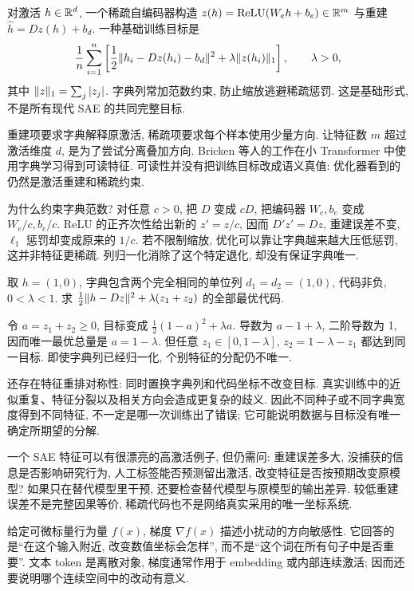 \begin{definition}
对激活 $h\in\mathbb R^d$, 一个稀疏自编码器构造 $z(h)=\operatorname{ReLU}(W_eh+b_e)\in\mathbb R^m$ 与重建 $\hat h=Dz(h)+b_d$. 一种基础训练目标是
\[
\frac1n\sum_{i=1}^n\left[\frac12\lVert h_i-Dz(h_i)-b_d\rVert^2+\lambda\lVert z(h_i)\rVert_1\right],\qquad \lambda>0,
\]
其中 $\lVert z\rVert_1=\sum_j|z_j|$. 字典列常加范数约束, 防止缩放逃避稀疏惩罚. 这是基础形式, 不是所有现代 SAE 的共同完整目标.
\end{definition}
重建项要求字典解释原激活, 稀疏项要求每个样本使用少量方向. 让特征数 $m$ 超过激活维度 $d$, 是为了尝试分离叠加方向. Bricken 等人的工作在小 Transformer 中使用字典学习得到可读特征\cite{sae}. 可读性并没有把训练目标改成语义真值: 优化器看到的仍然是激活重建和稀疏约束.

为什么约束字典范数? 对任意 $c>0$, 把 $D$ 变成 $cD$, 把编码器 $W_e,b_e$ 变成 $W_e/c,b_e/c$. ReLU 的正齐次性给出新的 $z'=z/c$, 因而 $D'z'=Dz$, 重建误差不变, $\ell_1$ 惩罚却变成原来的 $1/c$. 若不限制缩放, 优化可以靠让字典越来越大压低惩罚, 这并非特征更稀疏. 列归一化消除了这个特定退化, 却没有保证字典唯一.

\begin{example}
取 $h=(1,0)$, 字典包含两个完全相同的单位列 $d_1=d_2=(1,0)$, 代码非负, $0<\lambda<1$. 求 $\frac12\lVert h-Dz\rVert^2+\lambda(z_1+z_2)$ 的全部最优代码.
\end{example}
\begin{solution}
令 $a=z_1+z_2\ge0$, 目标变成 $\frac12(1-a)^2+\lambda a$. 导数为 $a-1+\lambda$, 二阶导数为 1, 因而唯一最优总量是 $a=1-\lambda$. 但任意 $z_1\in[0,1-\lambda]$, $z_2=1-\lambda-z_1$ 都达到同一目标. 即使字典列已经归一化, 个别特征的分配仍不唯一.
\end{solution}
还存在特征重排对称性: 同时置换字典列和代码坐标不改变目标. 真实训练中的近似重复、特征分裂以及相关方向会造成更复杂的歧义. 因此不同种子或不同字典宽度得到不同特征, 不一定是哪一次训练出了错误; 它可能说明数据与目标没有唯一确定所期望的分解.

一个 SAE 特征可以有很漂亮的高激活例子, 但仍需问: 重建误差多大, 没捕获的信息是否影响研究行为, 人工标签能否预测留出激活, 改变特征是否按预期改变原模型? 如果只在替代模型里干预, 还要检查替代模型与原模型的输出差异. 较低重建误差不是完整因果等价, 稀疏代码也不是网络真实采用的唯一坐标系统.

给定可微标量行为量 $f(x)$, 梯度 $\nabla f(x)$ 描述小扰动的方向敏感性. 它回答的是“在这个输入附近, 改变数值坐标会怎样”, 而不是“这个词在所有句子中是否重要”. 文本 token 是离散对象, 梯度通常作用于 embedding 或内部连续激活; 因而还要说明哪个连续空间中的改动有意义.

